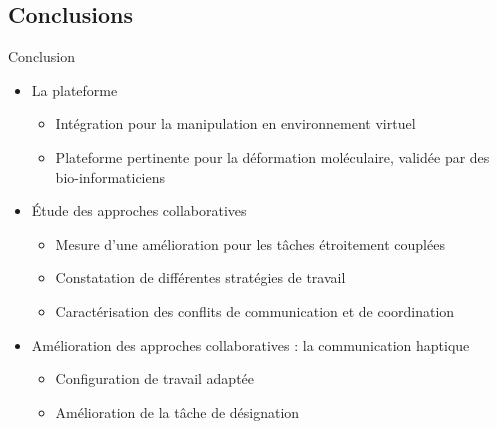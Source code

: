 \documentclass[english,french,dvips,10pt]{mybeamer}
\begin{document}
	\subsection{Conclusions}
	\begin{myframe}{Conclusion}
		\begin{itemize}
				\vfill
			\item La plateforme \myShaddock
				\begin{itemize}
					\item Intégration pour la manipulation en environnement virtuel
					\item Plateforme pertinente pour la déformation moléculaire, validée par des bio-informaticiens
				\end{itemize}
				\vfill
			\item Étude des approches collaboratives
				\begin{itemize}
					\item Mesure d'une amélioration pour les tâches étroitement couplées
					\item Constatation de différentes stratégies de travail
					\item Caractérisation des conflits de communication et de coordination
				\end{itemize}
				\vfill
			\item Amélioration des approches collaboratives : la communication haptique
				\begin{itemize}
					\item Configuration de travail adaptée
					\item Amélioration de la tâche de désignation
				\end{itemize}
				\vfill
		\end{itemize}
	\end{myframe}
\end{document}
